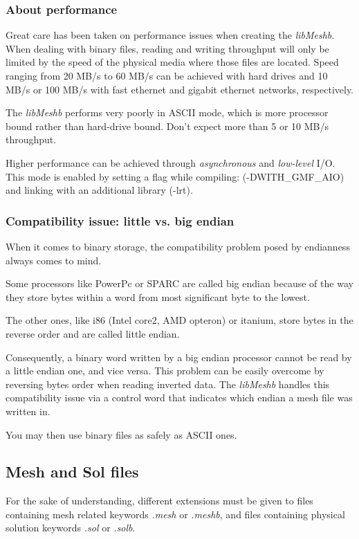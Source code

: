 \documentclass[a4paper,12pt]{article}
\begin{document}
\subsubsection{About performance}
Great care has been taken on performance issues when creating the \emph{libMeshb}. When dealing with binary files, reading and writing throughput will only be limited by the speed of the physical media where those files are located. Speed ranging from 20 MB/s to 60 MB/s can be achieved with hard drives and 10 MB/s or 100 MB/s with fast ethernet and gigabit ethernet networks, respectively.

The \emph{libMeshb} performs very poorly in ASCII mode, which is more processor bound rather than hard-drive bound. Don't expect more than 5 or 10 MB/s throughput.

Higher performance can be achieved through \emph{asynchronous} and \emph{low-level} I/O. This mode is enabled by setting a flag while compiling: (-DWITH\_GMF\_AIO) and linking with an additional library (-lrt).

\subsubsection{Compatibility issue: little vs. big endian}
When it comes to binary storage, the compatibility problem posed by endianness always comes to mind.

Some processors like PowerPc or SPARC are called big endian because of the way they store bytes within a word from most significant byte to the lowest.

The other ones, like i86 (Intel core2, AMD opteron) or itanium, store bytes in the reverse order and are called little endian.

Consequently, a binary word written by a big endian processor cannot be read by a little endian one, and vice versa. This problem can be easily overcome by reversing bytes order when reading inverted data. The \emph{libMeshb} handles this compatibility issue via a control word that indicates which endian a mesh file was written in.

You may then use binary files as safely as ASCII ones.

\subsection{Mesh and Sol files}
For the sake of understanding, different extensions must be given to files containing mesh related keywords \emph{.mesh} or \emph{.meshb}, and files containing physical solution keywords \emph{.sol} or \emph{.solb}.
\end{document}
